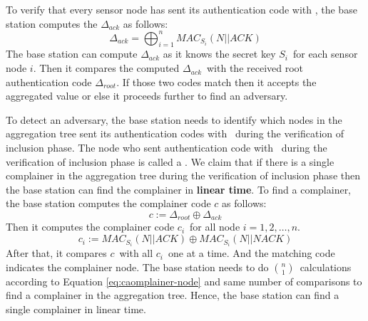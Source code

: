 		To verify that every sensor node has sent its authentication code with \ack, the base station computes the $\Delta_{ack}$ as follows:
		\begin{equation}
			\label{eq:mac-auth}
			\displaystyle{\Delta_{ack} = \bigoplus_{i = 1}^n MAC_{S_{i}}(N || ACK) }
		\end{equation}
		The base station can compute $\Delta_{ack}$ as it knows the secret key $S_{i}$\ for each sensor node $i$.
		Then it compares the computed $\Delta_{ack}$\ with the received root authentication code $\Delta_{root}$. 
		If those two codes match then it accepts the aggregated value or else it proceeds further to find an adversary. 

		To detect an adversary, the base station needs to identify which nodes in the aggregation tree sent its authentication codes with \nack\ during the verification of inclusion phase.
		The node who sent authentication code with \nack\ during the verification of inclusion phase is called a \complainer. 
		We claim that if there is a single complainer in the aggregation tree during the verification of inclusion phase then the base station can find the complainer in \textbf{linear time}.
		To find a complainer, the base station computes the complainer code $c$ as follows:
		\begin{equation}
			\label{eq:complainer}
			c := \Delta_{root} \oplus \Delta_{ack}
		\end{equation}
		Then it computes the complainer code $c_{i}$\ for all node $i = 1, 2, \dotsc, n$. 
		\begin{equation}
			\label{eq:caomplainer-node}
			c_{i} := MAC_{S_{i}}(N || ACK) \oplus MAC_{S_{i}}(N || NACK)
		\end{equation}
		After that, it compares $c$\ with all $c_{i}$\ one at a time. 
		And the matching code indicates the complainer node.
		The base station needs to do $n \choose 1$\ calculations according to Equation \ref{eq:caomplainer-node} and same number of comparisons to find a complainer in the aggregation tree. 
		Hence, the base station can find a single complainer in linear time.
